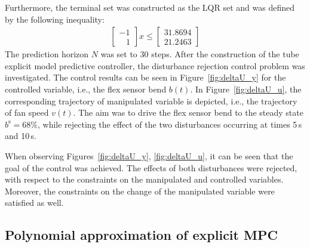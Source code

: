 \documentclass[letterpaper, 10 pt, conference]{ieeeconf}
\begin{document}
Furthermore, the terminal set was constructed as the LQR set and was defined by the following inequality:
\begin{eqnarray}
	\label{eq:setup_terminal_set}
	\begin{bmatrix}
	-1 \\	
	\,\,\,\,\, 1
	\end{bmatrix} x \le 
	\begin{bmatrix}
		31.8694\\	
		21.2463
	\end{bmatrix}
\end{eqnarray}
The prediction horizon $N$ was set to 30 steps. 
After the construction of the tube explicit model predictive controller, the disturbance rejection control problem was investigated. The control results can be seen in Figure~\ref{fig:deltaU_y} for the controlled variable, i.e., the flex sensor bend $b(t)$. In Figure~\ref{fig:deltaU_u}, the corresponding trajectory of manipulated variable is depicted, i.e., the trajectory of fan speed $v(t)$. The aim was to drive the flex sensor bend to the steady state $ b^\mathrm{s} = 68\%$, while rejecting the effect of the two disturbances occurring at times 5\,s and 10\,s. 

When observing Figures~\ref{fig:deltaU_y}, \ref{fig:deltaU_u}, it can be seen that the goal of the control was achieved. The effects of both disturbances were rejected, with respect to the constraints on the manipulated and controlled variables. Moreover, the constraints on the change of the manipulated variable were satisfied as well.

\subsection{Polynomial approximation of explicit MPC}
\label{sec:polynomial_exp}
\end{document}
